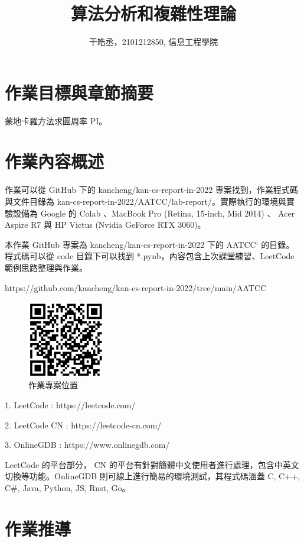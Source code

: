 \documentclass[10pt,UTF8]{ctexart}
\title{算法分析和複雜性理論}
\author{干皓丞，2101212850, 信息工程學院}
\begin{document}
\maketitle


\section{作業目標與章節摘要}

蒙地卡羅方法求圓周率 PI。

\section{作業內容概述}

作業可以從 GitHub 下的 kancheng/kan-cs-report-in-2022 專案找到，作業程式碼與文件目錄為 kan-cs-report-in-2022/AATCC/lab-report/。實際執行的環境與實驗設備為 Google 的 Colab 、MacBook Pro (Retina, 15-inch, Mid 2014) 、 Acer Aspire R7 與 HP Victus (Nvidia GeForce RTX 3060)。

本作業 GitHub 專案為 kancheng/kan-cs-report-in-2022 下的 AATCC` 的目錄。程式碼可以從 code 目錄下可以找到 *.pynb，內容包含上次課堂練習、LeetCode 範例思路整理與作業。

https://github.com/kancheng/kan-cs-report-in-2022/tree/main/AATCC

\begin{figure}[H]
\centering 
\includegraphics[width=0.30\textwidth]{aatccqr.png} 
\caption{作業專案位置}
\label{Test}
\end{figure}

1. LeetCode : https://leetcode.com/

2. LeetCode CN : https://leetcode-cn.com/

3. OnlineGDB : https://www.onlinegdb.com/ 

LeetCode 的平台部分， CN 的平台有針對簡體中文使用者進行處理，包含中英文切換等功能。OnlineGDB 則可線上進行簡易的環境測試，其程式碼涵蓋 C, C++, C\#, Java, Python, JS, Rust, Go。

\newpage

\section{作業推導}
\end{document}

